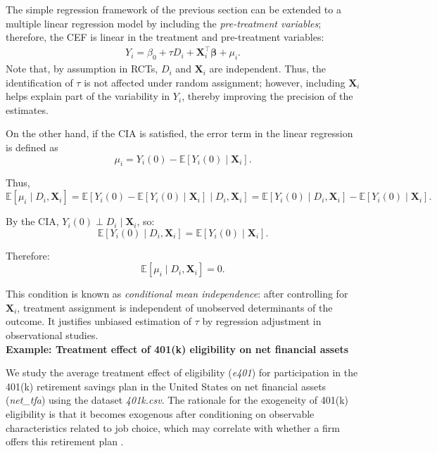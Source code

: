 The simple regression framework of the previous section can be extended to a multiple linear regression model by including the \textit{pre-treatment variables}; therefore, the CEF is linear in the treatment and pre-treatment variables:
\begin{align*}
	Y_i = \beta_0 + \tau D_i + \mathbf{X}_i^{\top}\boldsymbol{\beta} + \mu_i.
\end{align*}
Note that, by assumption in RCTs, $D_i$ and $\mathbf{X}_i$ are independent. Thus, the identification of $\tau$ is not affected under random assignment; however, including $\mathbf{X}_i$ helps explain part of the variability in $Y_i$, thereby improving the precision of the estimates.

On the other hand, if the CIA is satisfied, the error term in the linear regression is defined as
\[
\mu_i = Y_i(0) - \mathbb{E}[Y_i(0) \mid \mathbf{X}_i].
\]

Thus,
\[
\mathbb{E}[\mu_i \mid D_i, \mathbf{X}_i] = \mathbb{E}[Y_i(0) - \mathbb{E}[Y_i(0) \mid \mathbf{X}_i] \mid D_i, \mathbf{X}_i] 
= \mathbb{E}[Y_i(0) \mid D_i, \mathbf{X}_i] - \mathbb{E}[Y_i(0) \mid \mathbf{X}_i].
\]

By the CIA, $Y_i(0) \perp D_i \mid \mathbf{X}_i$, so:
\[
\mathbb{E}[Y_i(0) \mid D_i, \mathbf{X}_i] = \mathbb{E}[Y_i(0) \mid \mathbf{X}_i].
\]

Therefore:
\begin{equation}\label{eq:12_2}
	\mathbb{E}[\mu_i \mid D_i, \mathbf{X}_i] = 0.
\end{equation}

This condition is known as \textit{conditional mean independence}: after controlling for $\mathbf{X}_i$, treatment assignment is independent of unobserved determinants of the outcome. It justifies unbiased estimation of $\tau$ by regression adjustment in observational studies.\\

\textbf{Example: Treatment effect of 401(k) eligibility on net financial assets}

We study the average treatment effect of eligibility (\textit{e401}) for participation in the 401(k) retirement savings plan in the United States on net financial assets (\textit{net\_tfa}) using the dataset \textit{401k.csv}. The rationale for the exogeneity of 401(k) eligibility is that it becomes exogenous after conditioning on observable characteristics related to job choice, which may correlate with whether a firm offers this retirement plan \cite{chernozhukov2024applied}.


